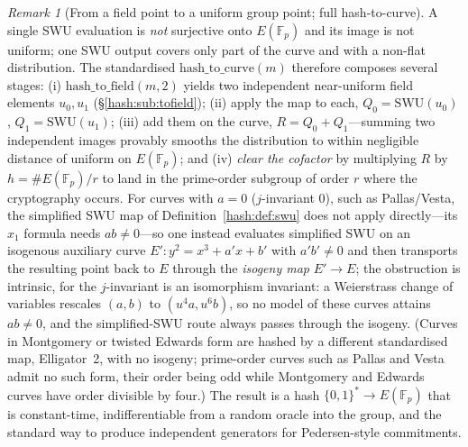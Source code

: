 \documentclass[11pt,a4paper]{article}
\theoremstyle{definition}
\theoremstyle{remark}
\newtheorem{remark}[theorem]{Remark}
\newcommand{\Fp}{\ensuremath{\mathbb{F}_{p}}}
\begin{document}
\begin{remark}[From a field point to a uniform group point; full hash-to-curve]\label{hash:rem:fullh2c}
A single SWU evaluation is \emph{not} surjective onto \(E(\Fp)\) and its image is not uniform; one SWU output covers only part of the curve and with a non-flat distribution. The standardised \(\mathrm{hash\_to\_curve}(m)\) therefore composes several stages: (i) \(\mathrm{hash\_to\_field}(m,2)\) yields two independent near-uniform field elements \(u_{0}, u_{1}\) (\S\ref{hash:sub:tofield}); (ii) apply the map to each, \(Q_{0} = \mathrm{SWU}(u_{0})\), \(Q_{1} = \mathrm{SWU}(u_{1})\); (iii) add them on the curve, \(R = Q_{0} + Q_{1}\)---summing two independent images provably smooths the distribution to within negligible distance of uniform on \(E(\Fp)\); and (iv) \emph{clear the cofactor} by multiplying \(R\) by \(h = \#E(\Fp)/r\) to land in the prime-order subgroup of order \(r\) where the cryptography occurs. For curves with \(a = 0\) (\(j\)-invariant \(0\)), such as Pallas/Vesta, the simplified SWU map of Definition~\ref{hash:def:swu} does not apply directly---its \(x_{1}\) formula needs \(ab \neq 0\)---so one instead evaluates simplified SWU on an isogenous auxiliary curve \(E' \colon y^{2} = x^{3} + a'x + b'\) with \(a'b' \neq 0\) and then transports the resulting point back to \(E\) through the \emph{isogeny map} \(E' \to E\); the obstruction is intrinsic, for the \(j\)-invariant is an isomorphism invariant: a Weierstrass change of variables rescales \((a, b)\) to \((u^{4}a, u^{6}b)\), so no model of these curves attains \(ab \neq 0\), and the simplified-SWU route always passes through the isogeny. (Curves in Montgomery or twisted Edwards form are hashed by a different standardised map, Elligator~2, with no isogeny; prime-order curves such as Pallas and Vesta admit no such form, their order being odd while Montgomery and Edwards curves have order divisible by four.) The result is a hash \(\{0,1\}^{*} \to E(\Fp)\) that is constant-time, indifferentiable from a random oracle into the group, and the standard way to produce independent generators for Pedersen-style commitments.
\end{remark}
\end{document}
